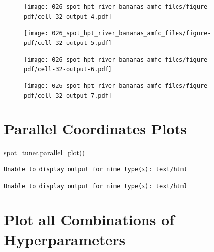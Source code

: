 \documentclass[
  letterpaper,
  DIV=11,
  numbers=noendperiod]{scrreprt}
\newenvironment{Shaded}{\begin{snugshade}}{\end{snugshade}}
\newcommand{\NormalTok}[1]{\textcolor[rgb]{0.00,0.23,0.31}{#1}}
\begin{document}
\begin{figure}[H]

{\centering \texttt{[image: 026\_spot\_hpt\_river\_bananas\_amfc\_files/figure-pdf/cell-32-output-4.pdf]}

}

\end{figure}

\begin{figure}[H]

{\centering \texttt{[image: 026\_spot\_hpt\_river\_bananas\_amfc\_files/figure-pdf/cell-32-output-5.pdf]}

}

\end{figure}

\begin{figure}[H]

{\centering \texttt{[image: 026\_spot\_hpt\_river\_bananas\_amfc\_files/figure-pdf/cell-32-output-6.pdf]}

}

\end{figure}

\begin{figure}[H]

{\centering \texttt{[image: 026\_spot\_hpt\_river\_bananas\_amfc\_files/figure-pdf/cell-32-output-7.pdf]}

}

\end{figure}

\hypertarget{parallel-coordinates-plots-2}{%
\section{Parallel Coordinates
Plots}\label{parallel-coordinates-plots-2}}

\begin{Shaded}
\begin{Highlighting}[]
\NormalTok{spot\_tuner.parallel\_plot()}
\end{Highlighting}
\end{Shaded}

\begin{verbatim}
Unable to display output for mime type(s): text/html
\end{verbatim}

\begin{verbatim}
Unable to display output for mime type(s): text/html
\end{verbatim}

\hypertarget{plot-all-combinations-of-hyperparameters-7}{%
\section{Plot all Combinations of
Hyperparameters}\label{plot-all-combinations-of-hyperparameters-7}}
\end{document}
